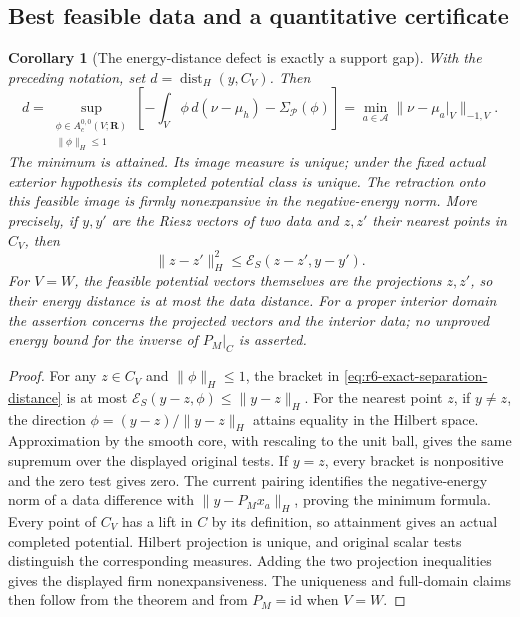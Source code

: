 \documentclass[11pt,a4paper]{article}
\numberwithin{equation}{section}
\newtheorem{corollary}[theorem]{Corollary}
\theoremstyle{definition}
\theoremstyle{remark}
\begin{document}
\subsection{Best feasible data and a quantitative certificate}

\begin{corollary}[The energy-distance defect is exactly a support gap]
\label{cor:r6-energy-data-projection}
With the preceding notation, set $d=\operatorname{dist}_H(y,C_V)$.
Then
\begin{equation}
 d=\sup_{\substack{\phi\in A_c^{0,0}(V;\mathbf R)\\
                            \|\phi\|_H\le1}}
       \left[-\int_V\phi\,d(\nu-\mu_h)
                         -\Sigma_{\mathscr P}(\phi)\right]
   =\min_{a\in\mathscr A}\|\nu-\mu_a|_V\|_{-1,V}.
 \label{eq:r6-exact-separation-distance}
\end{equation}
The minimum is attained. Its image measure is unique; under the fixed
actual exterior hypothesis its completed potential class is unique.
The retraction onto this feasible image is firmly nonexpansive in the
negative-energy norm. More precisely, if $y,y'$ are the Riesz vectors
of two data and $z,z'$ their nearest points in $C_V$, then
\[
             \|z-z'\|_H^2\le\mathcal E_S(z-z',y-y').
\]
For $V=W$, the feasible potential vectors themselves are the projections
$z,z'$, so their energy distance is at most the data distance.
For a proper interior domain the assertion concerns the projected
vectors and the interior data; no unproved energy bound for the inverse
of $P_M|_C$ is asserted.
\end{corollary}

\begin{proof}
For any $z\in C_V$ and $\|\phi\|_H\le1$, the bracket in
\eqref{eq:r6-exact-separation-distance} is at most
$\mathcal E_S(y-z,\phi)\le\|y-z\|_H$.
For the nearest point $z$, if $y\ne z$, the direction
$\phi=(y-z)/\|y-z\|_H$ attains equality in the Hilbert space.
Approximation by the smooth core, with rescaling to the unit ball,
gives the same supremum over the displayed original tests. If $y=z$,
every bracket is nonpositive and the zero test gives zero.
The current pairing identifies the negative-energy norm of a data
difference with $\|y-P_Mx_a\|_H$, proving the minimum formula.
Every point of $C_V$ has a lift in $C$ by its definition, so attainment
gives an actual completed potential. Hilbert projection is unique,
and original scalar tests distinguish the corresponding measures.
Adding the two projection inequalities gives the displayed firm
nonexpansiveness. The uniqueness and full-domain claims then follow
from the theorem and from $P_M=\mathrm{id}$ when $V=W$.
\end{proof}
\end{document}
